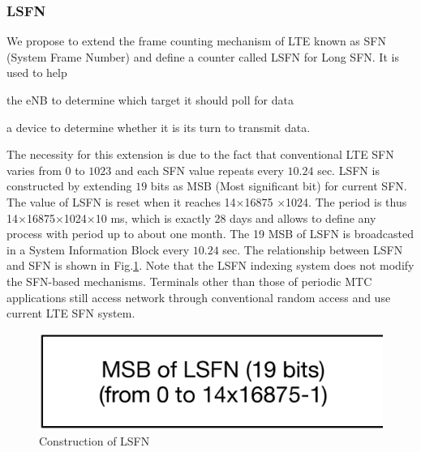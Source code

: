 
\subsubsection{LSFN}
\label{LSFN}
We propose to extend the frame counting mechanism of LTE known as SFN (System Frame Number) and define a counter called LSFN for Long SFN. It is used to help\begin{inparaenum}[i)]
	\item the eNB to determine which target it should poll for data 
	\item a device to determine whether it is its turn to transmit data.
\end{inparaenum}
 The necessity for this extension is due to the fact that conventional LTE SFN varies from $0$ to $1023$ and each SFN value repeats every $10.24$ sec. LSFN is constructed by extending $19$ bits as MSB (Most significant bit) for current SFN. The value of LSFN is reset when it reaches 14$\times$16875 $\times$1024. The period is thus 14$\times$16875$\times$1024$\times$10 ms, which is exactly $28$ days and allows to define any process with period up to about one month.
The 19 MSB of LSFN is broadcasted in a System Information Block every $10.24$ sec. 
The relationship between LSFN and SFN is shown in Fig.\ref{fig:construction of LSFN}.  
Note that the LSFN indexing system does not modify the SFN-based mechanisms. 
Terminals other than those of periodic MTC applications still access network through conventional random access and use current LTE SFN system. 

\begin{figure}[!t]
	\centering
	\includegraphics[width=0.6\linewidth]{Chapter6/Figures/Construction-LSFN.eps}
	\caption{Construction of LSFN}
	\label{fig:construction of LSFN}
\end{figure}

